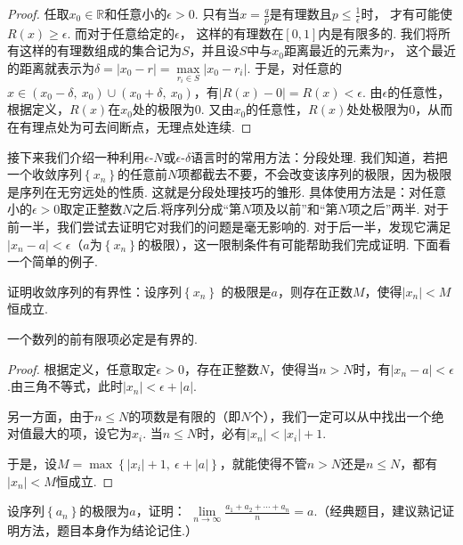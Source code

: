 \begin{proof}
任取$x_{0}\in\mathbb{R}$和任意小的$\epsilon>0$. 只有当$x = \frac{q}{p}$是有理数且$p\le \displaystyle\frac{1}{\epsilon}$时，
才有可能使$R(x)\ge \epsilon$.
而对于任意给定的$\epsilon$，
这样的有理数在$[0,1]$内是有限多的. 我们将所有这样的有理数组成的集合记为$S$，并且设$S$中与$x_{0}$距离最近的元素为$r$，
这个最近的距离就表示为$\delta = |x_{0}-r| = \mathop{max}\limits_{r_{i} \in S}|x_{0}-r_{i}|$.
于是，对任意的$x \in (x_{0}-\delta,~x_{0})\cup (x_{0}+\delta,~x_{0})$，有$|R(x)-0|=R(x)<\epsilon$.
由$\epsilon$的任意性，根据定义，$R(x)$在$x_{0}$处的极限为0. 又由$x_{0}$的任意性，$R(x)$处处极限为0，从而在有理点处为可去间断点，无理点处连续.
\end{proof}

接下来我们介绍一种利用$\epsilon\text{-}N$或$\epsilon\text{-}\delta$语言时的常用方法：分段处理. 我们知道，若把一个收敛序列$\left \{ x_{n} \right  \}$的任意前$N$项都截去不要，不会改变该序列的极限，因为极限是序列在无穷远处的性质.
这就是分段处理技巧的雏形. 具体使用方法是：对任意小的$\epsilon > 0$取定正整数$N$之后.将序列分成“第$N$项及以前”和“第$N$项之后”两半. 对于前一半，我们尝试去证明它对我们的问题是毫无影响的.
对于后一半，发现它满足$|x_{n}-a|<\epsilon$（$a$为$\left \{ x_{n} \right  \}$的极限），这一限制条件有可能帮助我们完成证明. 下面看一个简单的例子.

\begin{example}
\label{ex:ch01-05}
证明收敛序列的有界性：设序列$\left \{ x_{n} \right  \}$
的极限是$a$，则存在正数$M$，使得$|x_{n}|<M$恒成立.
\end{example}

\begin{analysis}
一个数列的前有限项必定是有界的.
\end{analysis}

\begin{proof}
根据定义，任意取定$\epsilon > 0$，存在正整数$N$，使得当$n>N$时，有$|x_{n}-a|<\epsilon$.由三角不等式，此时$|x_{n}|<\epsilon + |a|$.\par
另一方面，由于$n \le N$的项数是有限的（即$N$个），我们一定可以从中找出一个绝对值最大的项，设它为$x_{i}$. 当$n \le N$时，必有$|x_{n}|<|x_{i}|+1$. \par
于是，设$M=\mathop{max}\left \{|x_{i}|+1,~\epsilon+|a|\right \}$，就能使得不管$n>N$还是$n\le N$，都有$|x_{n}|<M$恒成立.
\end{proof}

\begin{example}
\label{ex:ch01-06}
设序列$\left \{ a_{n} \right  \}$的极限为$a$，证明：
$\lim\limits_{n \to \infty}\displaystyle\frac{a_{1}+a_{2}+\cdots+a_{n}}{n}=a$.（经典题目，建议熟记证明方法，题目本身作为结论记住.）
\end{example}

